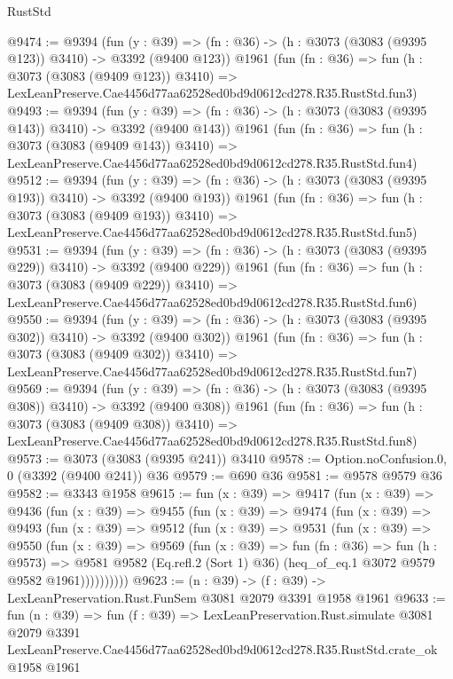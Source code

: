\begin{lexlean}{RustStd}
\begin{coremodule}
@9474 := @9394
    (fun (y : @39) => (fn : @36) -> (h : @3073 (@3083 (@9395 @123)) @3410) -> @3392 (@9400 @123))
    @1961
    (fun (fn : @36) =>
    fun (h : @3073 (@3083 (@9409 @123)) @3410) =>
    LexLeanPreserve.Cae4456d77aa62528ed0bd9d0612cd278.R35.RustStd.fun3)
@9493 := @9394
    (fun (y : @39) => (fn : @36) -> (h : @3073 (@3083 (@9395 @143)) @3410) -> @3392 (@9400 @143))
    @1961
    (fun (fn : @36) =>
    fun (h : @3073 (@3083 (@9409 @143)) @3410) =>
    LexLeanPreserve.Cae4456d77aa62528ed0bd9d0612cd278.R35.RustStd.fun4)
@9512 := @9394
    (fun (y : @39) => (fn : @36) -> (h : @3073 (@3083 (@9395 @193)) @3410) -> @3392 (@9400 @193))
    @1961
    (fun (fn : @36) =>
    fun (h : @3073 (@3083 (@9409 @193)) @3410) =>
    LexLeanPreserve.Cae4456d77aa62528ed0bd9d0612cd278.R35.RustStd.fun5)
@9531 := @9394
    (fun (y : @39) => (fn : @36) -> (h : @3073 (@3083 (@9395 @229)) @3410) -> @3392 (@9400 @229))
    @1961
    (fun (fn : @36) =>
    fun (h : @3073 (@3083 (@9409 @229)) @3410) =>
    LexLeanPreserve.Cae4456d77aa62528ed0bd9d0612cd278.R35.RustStd.fun6)
@9550 := @9394
    (fun (y : @39) => (fn : @36) -> (h : @3073 (@3083 (@9395 @302)) @3410) -> @3392 (@9400 @302))
    @1961
    (fun (fn : @36) =>
    fun (h : @3073 (@3083 (@9409 @302)) @3410) =>
    LexLeanPreserve.Cae4456d77aa62528ed0bd9d0612cd278.R35.RustStd.fun7)
@9569 := @9394
    (fun (y : @39) => (fn : @36) -> (h : @3073 (@3083 (@9395 @308)) @3410) -> @3392 (@9400 @308))
    @1961
    (fun (fn : @36) =>
    fun (h : @3073 (@3083 (@9409 @308)) @3410) =>
    LexLeanPreserve.Cae4456d77aa62528ed0bd9d0612cd278.R35.RustStd.fun8)
@9573 := @3073 (@3083 (@9395 @241)) @3410
@9578 := Option.noConfusion.{0, 0} (@3392 (@9400 @241)) @36
@9579 := @690 @36
@9581 := @9578 @9579 @36
@9582 := @3343 @1958
@9615 := fun (x : @39) =>
  @9417
    (fun (x : @39) =>
    @9436
      (fun (x : @39) =>
      @9455
        (fun (x : @39) =>
        @9474
          (fun (x : @39) =>
          @9493
            (fun (x : @39) =>
            @9512
              (fun (x : @39) =>
              @9531
                (fun (x : @39) =>
                @9550
                  (fun (x : @39) =>
                  @9569
                    (fun (x : @39) =>
                    fun (fn : @36) =>
                    fun (h : @9573) =>
                    @9581
                      @9582
                      (Eq.refl.{2} (Sort 1) @36)
                      (heq_of_eq.{1} @3072 @9579 @9582 @1961))))))))))
@9623 := (n : @39) -> (f : @39) -> LexLeanPreservation.Rust.FunSem @3081 @2079 @3391 @1958 @1961
@9633 := fun (n : @39) =>
  fun (f : @39) =>
  LexLeanPreservation.Rust.simulate
    @3081
    @2079
    @3391
    LexLeanPreserve.Cae4456d77aa62528ed0bd9d0612cd278.R35.RustStd.crate_ok
    @1958
    @1961
\end{coremodule}
\end{lexlean}
